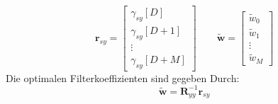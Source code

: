\[ \textbf{r}_{sy} = \begin{bmatrix}
	\gamma_{sy}[D]\\
	\gamma_{sy}[D+1]\\
	\vdots\\
	\gamma_{sy}[D+M]
\end{bmatrix} \qquad
  \tilde{\textbf{w}} = \begin{bmatrix}
	\tilde{w}_0\\
	\tilde{w}_1\\
	\vdots\\
	\tilde{w}_M
\end{bmatrix} \]
Die optimalen Filterkoeffizienten sind gegeben Durch:
\[ \tilde{\textbf{w}} = \textbf{R}_{yy}^{-1}\textbf{r}_{sy} \]
